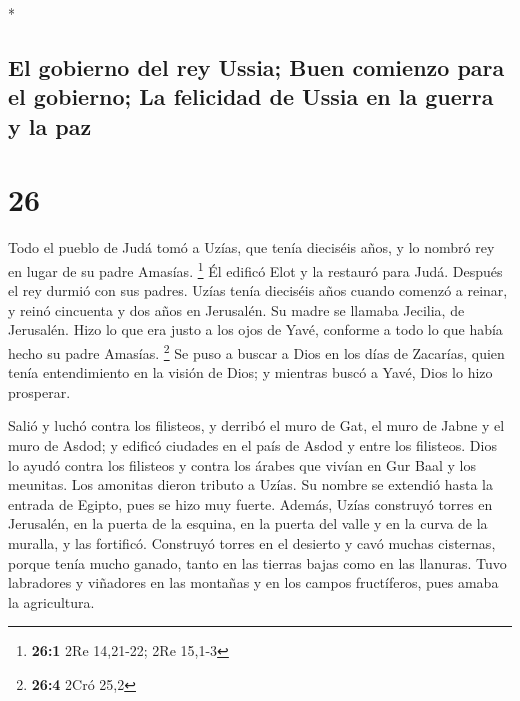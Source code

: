 \begin{paracol}{2}
\begin{otherlanguage}{english}
\end{otherlanguage}

\switchcolumn[0]*

\hypertarget{el-gobierno-del-rey-ussia-buen-comienzo-para-el-gobierno-la-felicidad-de-ussia-en-la-guerra-y-la-paz}{%
\subsection{El gobierno del rey Ussia; Buen comienzo para el gobierno;
La felicidad de Ussia en la guerra y la
paz}\label{el-gobierno-del-rey-ussia-buen-comienzo-para-el-gobierno-la-felicidad-de-ussia-en-la-guerra-y-la-paz}}

\hypertarget{section-50}{%
\section{26}\label{section-50}}

 Todo el pueblo de Judá tomó a Uzías, que tenía dieciséis
años, y lo nombró rey en lugar de su padre Amasías. \footnote{\textbf{26:1}
  2Re 14,21-22; 2Re 15,1-3}  Él edificó Elot y la restauró
para Judá. Después el rey durmió con sus padres.  Uzías
tenía dieciséis años cuando comenzó a reinar, y reinó cincuenta y dos
años en Jerusalén. Su madre se llamaba Jecilia, de Jerusalén.
 Hizo lo que era justo a los ojos de Yavé, conforme a todo
lo que había hecho su padre Amasías. \footnote{\textbf{26:4} 2Cró 25,2}
 Se puso a buscar a Dios en los días de Zacarías, quien
tenía entendimiento en la visión de Dios; y mientras buscó a Yavé, Dios
lo hizo prosperar.

 Salió y luchó contra los filisteos, y derribó el muro de
Gat, el muro de Jabne y el muro de Asdod; y edificó ciudades en el país
de Asdod y entre los filisteos.  Dios lo ayudó contra los
filisteos y contra los árabes que vivían en Gur Baal y los meunitas.
 Los amonitas dieron tributo a Uzías. Su nombre se
extendió hasta la entrada de Egipto, pues se hizo muy fuerte.
 Además, Uzías construyó torres en Jerusalén, en la puerta
de la esquina, en la puerta del valle y en la curva de la muralla, y las
fortificó.  Construyó torres en el desierto y cavó muchas
cisternas, porque tenía mucho ganado, tanto en las tierras bajas como en
las llanuras. Tuvo labradores y viñadores en las montañas y en los
campos fructíferos, pues amaba la agricultura.

\hypertarget{la-preocupaciuxf3n-de-ussia-por-un-ejuxe9rcito-capaz-y-por-la-seguridad-del-pauxeds}{%
}
\end{paracol}
